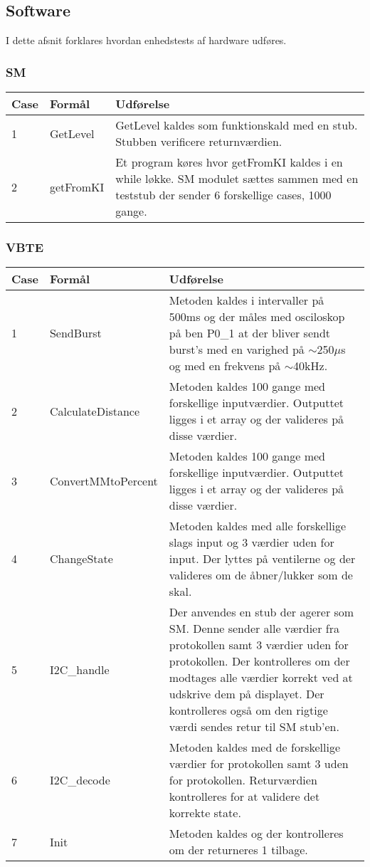 \subsection{Software}
I dette afsnit forklares hvordan enhedstests af hardware udføres.
\subsubsection{SM}
\begin{table}[H]
\centering
\begin{tabular}{| p{1.2cm}  | p{4.5cm} | p{8cm} |}
\hline
Case &Formål &Udførelse\\\hline
1 &GetLevel &GetLevel kaldes som funktionskald med en stub. Stubben verificere returnværdien.\\\hline
2  &getFromKI &Et program køres hvor getFromKI kaldes i en while løkke. SM modulet sættes sammen med en teststub der sender 6 forskellige cases, 1000 gange.\\\hline
\end{tabular}
\end{table}
\subsubsection{VBTE}
\begin{table}[H]
\centering
\begin{tabular}{| p{1.2cm}  | p{4.5cm} | p{8cm} |}
\hline
Case &Formål &Udførelse\\\hline
1 &SendBurst &Metoden kaldes i intervaller på 500ms og der måles med osciloskop på ben P0\_1 at der bliver sendt burst's med en varighed på $\sim$250$\mu$s og med en frekvens på $\sim$40kHz.\\\hline
2  &CalculateDistance & Metoden kaldes 100 gange med forskellige inputværdier. Outputtet ligges i et array og der valideres på disse værdier.\\\hline
3 &ConvertMMtoPercent & Metoden kaldes 100 gange med forskellige inputværdier. Outputtet ligges i et array og der valideres på disse værdier.\\\hline
4 & ChangeState & Metoden kaldes med alle forskellige slags input og 3 værdier uden for input. Der lyttes på ventilerne og der valideres om de åbner/lukker som de skal.\\\hline
5 & I2C\_handle & Der anvendes en stub der agerer som SM. Denne sender alle værdier fra protokollen samt 3 værdier uden for protokollen. Der kontrolleres om der modtages alle værdier korrekt ved at udskrive dem på displayet. Der kontrolleres også om den rigtige værdi sendes retur til SM stub'en.\\\hline
6 & I2C\_decode & Metoden kaldes med de forskellige værdier for protokollen samt 3 uden for protokollen. Returværdien kontrolleres for at validere det korrekte state.\\\hline
7 & Init & Metoden kaldes og der kontrolleres om der returneres 1 tilbage.\\\hline
\end{tabular}
\end{table}

